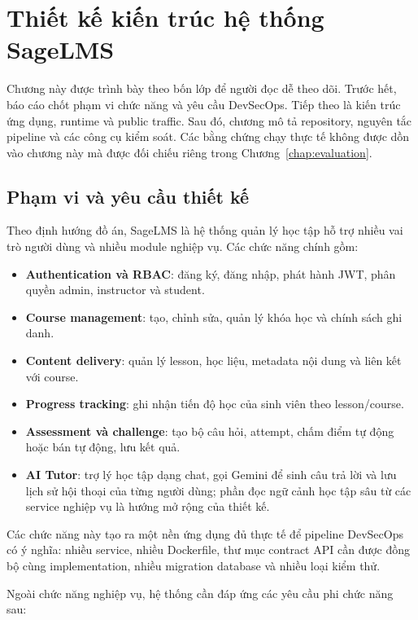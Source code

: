 \chapter{Thiết kế kiến trúc hệ thống SageLMS}
\label{chap:system-architecture}
\label{chap:requirements}
\label{chap:pipeline-design}

Chương này được trình bày theo bốn lớp để người đọc dễ theo dõi. Trước hết, báo cáo chốt phạm vi chức năng và yêu cầu DevSecOps. Tiếp theo là kiến trúc ứng dụng, runtime và public traffic. Sau đó, chương mô tả repository, nguyên tắc pipeline và các công cụ kiểm soát. Các bằng chứng chạy thực tế không được dồn vào chương này mà được đối chiếu riêng trong Chương~\ref{chap:evaluation}.

\section{Phạm vi và yêu cầu thiết kế}

Theo định hướng đồ án, SageLMS là hệ thống quản lý học tập hỗ trợ nhiều vai trò người dùng và nhiều module nghiệp vụ. Các chức năng chính gồm:

\begin{itemize}
  \item \textbf{Authentication và RBAC}: đăng ký, đăng nhập, phát hành JWT, phân quyền admin, instructor và student.
  \item \textbf{Course management}: tạo, chỉnh sửa, quản lý khóa học và chính sách ghi danh.
  \item \textbf{Content delivery}: quản lý lesson, học liệu, metadata nội dung và liên kết với course.
  \item \textbf{Progress tracking}: ghi nhận tiến độ học của sinh viên theo lesson/course.
  \item \textbf{Assessment và challenge}: tạo bộ câu hỏi, attempt, chấm điểm tự động hoặc bán tự động, lưu kết quả.
  \item \textbf{AI Tutor}: trợ lý học tập dạng chat, gọi Gemini để sinh câu trả lời và lưu lịch sử hội thoại của từng người dùng; phần đọc ngữ cảnh học tập sâu từ các service nghiệp vụ là hướng mở rộng của thiết kế.
\end{itemize}

Các chức năng này tạo ra một nền ứng dụng đủ thực tế để pipeline DevSecOps có ý nghĩa: nhiều service, nhiều Dockerfile, thư mục contract API cần được đồng bộ cùng implementation, nhiều migration database và nhiều loại kiểm thử.

Ngoài chức năng nghiệp vụ, hệ thống cần đáp ứng các yêu cầu phi chức năng sau:

